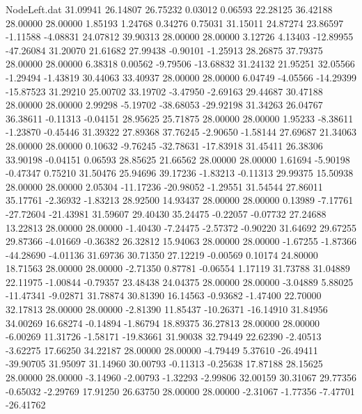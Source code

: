 \begin{filecontents}{NodeLeft.dat}
  31.09941   26.14807   26.75232     0.03012    0.06593   22.28125   36.42188   28.00000   28.00000    1.85193    1.24768    0.34276    0.75031
  31.15011   24.87274   23.86597    -1.11588   -4.08831   24.07812   39.90313   28.00000   28.00000    3.12726    4.13403  -12.89955  -47.26084
  31.20070   21.61682   27.99438    -0.90101   -1.25913   28.26875   37.79375   28.00000   28.00000    6.38318    0.00562   -9.79506  -13.68832
  31.24132   21.95251   32.05566    -1.29494   -1.43819   30.44063   33.40937   28.00000   28.00000    6.04749   -4.05566  -14.29399  -15.87523
  31.29210   25.00702   33.19702    -3.47950   -2.69163   29.44687   30.47188   28.00000   28.00000    2.99298   -5.19702  -38.68053  -29.92198
  31.34263   26.04767   36.38611    -0.11313   -0.04151   28.95625   25.71875   28.00000   28.00000    1.95233   -8.38611   -1.23870   -0.45446
  31.39322   27.89368   37.76245    -2.90650   -1.58144   27.69687   21.34063   28.00000   28.00000    0.10632   -9.76245  -32.78631  -17.83918
  31.45411   26.38306   33.90198    -0.04151    0.06593   28.85625   21.66562   28.00000   28.00000    1.61694   -5.90198   -0.47347    0.75210
  31.50476   25.94696   39.17236    -1.83213   -0.11313   29.99375   15.50938   28.00000   28.00000    2.05304  -11.17236  -20.98052   -1.29551
  31.54544   27.86011   35.17761    -2.36932   -1.83213   28.92500   14.93437   28.00000   28.00000    0.13989   -7.17761  -27.72604  -21.43981
  31.59607   29.40430   35.24475    -0.22057   -0.07732   27.24688   13.22813   28.00000   28.00000   -1.40430   -7.24475   -2.57372   -0.90220
  31.64692   29.67255   29.87366    -4.01669   -0.36382   26.32812   15.94063   28.00000   28.00000   -1.67255   -1.87366  -44.28690   -4.01136
  31.69736   30.71350   27.12219    -0.00569    0.10174   24.80000   18.71563   28.00000   28.00000   -2.71350    0.87781   -0.06554    1.17119
  31.73788   31.04889   22.11975    -1.00844   -0.79357   23.48438   24.04375   28.00000   28.00000   -3.04889    5.88025  -11.47341   -9.02871
  31.78874   30.81390   16.14563    -0.93682   -1.47400   22.70000   32.17813   28.00000   28.00000   -2.81390   11.85437  -10.26371  -16.14910
  31.84956   34.00269   16.68274    -0.14894   -1.86794   18.89375   36.27813   28.00000   28.00000   -6.00269   11.31726   -1.58171  -19.83661
  31.90038   32.79449   22.62390    -2.40513   -3.62275   17.66250   34.22187   28.00000   28.00000   -4.79449    5.37610  -26.49411  -39.90705
  31.95097   31.14960   30.00793    -0.11313   -0.25638   17.87188   28.15625   28.00000   28.00000   -3.14960   -2.00793   -1.32293   -2.99806
  32.00159   30.31067   29.77356    -0.65032   -2.29769   17.91250   26.63750   28.00000   28.00000   -2.31067   -1.77356   -7.47701  -26.41762

\end{filecontents}

